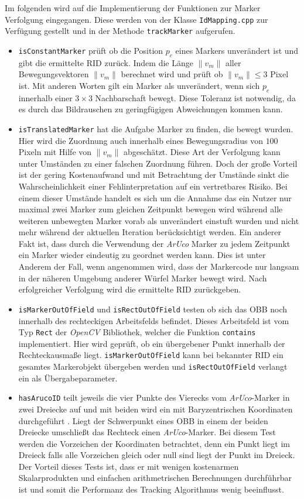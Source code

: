 Im folgenden wird auf die Implementierung der Funktionen zur Marker Verfolgung  eingegangen. Diese werden von der Klasse \texttt{IdMapping.cpp} zur Verfügung gestellt und in der Methode \texttt{trackMarker} aufgerufen.
\begin{itemize}
\item \texttt{isConstantMarker} prüft ob die Position $p_c$ eines Markers unverändert ist und gibt die ermittelte RID zurück. Indem die Länge $\|v_m\|$ aller Bewegungsvektoren $\|v_m\|$ berechnet wird und prüft ob $\|v_m\|\le 3$ Pixel ist. Mit anderen Worten gilt ein Marker als unverändert, wenn sich $p_c$ innerhalb einer $3 \times 3$ Nachbarschaft bewegt. Diese Toleranz ist notwendig, da es durch das Bildrauschen zu geringfügigen Abweichungen kommen kann.
\item \texttt{isTranslatedMarker} hat die Aufgabe Marker zu finden, die bewegt wurden. Hier wird die Zuordnung auch innerhalb eines Bewegungsradius von $100$ Pixeln mit Hilfe von $\|v_m\|$  abgeschätzt. Diese Art der Verfolgung kann unter Umständen zu einer falschen Zuordnung führen. Doch der große Vorteil ist der gering Kostenaufwand und mit Betrachtung der Umstände sinkt die Wahrscheinlichkeit einer Fehlinterpretation auf ein vertretbares Risiko. Bei einem dieser Umstände handelt es sich um die Annahme das ein Nutzer nur maximal zwei Marker zum gleichen Zeitpunkt bewegen wird während alle weiteren unbewegten Marker vorab als unverändert einstuft wurden und nicht mehr während der aktuellen Iteration berücksichtigt werden.
Ein anderer Fakt ist, dass durch die Verwendung der \textit{ArUco} Marker zu jedem Zeitpunkt ein Marker wieder eindeutig zu geordnet werden kann. Dies ist unter Anderem der Fall, wenn angenommen wird, dass der Markercode nur langsam in der näheren Umgebung anderer Würfel Marker bewegt wird. Nach erfolgreicher Verfolgung wird die ermittelte RID zurückgeben.
\item \texttt{isMarkerOutOfField} und \texttt{isRectOutOfField} testen ob sich das OBB noch innerhalb des rechteckigen Arbeitsfelds befindet. Dieses Arbeitsfeld ist vom Typ \texttt{Rect} der \textit{OpenCV} Bibliothek, welcher die Funktion \texttt{contains} implementiert. Hier wird geprüft, ob ein übergebener Punkt innerhalb der Rechteckausmaße liegt. \texttt{isMarkerOutOfField} kann bei bekannter RID ein gesamtes Markerobjekt übergeben werden und \texttt{isRectOutOfField} verlangt ein  als Übergabeparameter.
\item \texttt{hasArucoID} teilt jeweils die vier Punkte des Vierecks vom \textit{ArUco}-Marker in zwei Dreiecke auf und mit beiden wird ein  mit Baryzentrischen Koordinaten durchgeführt \cite{article:BaryzentriFarin}. Liegt der Schwerpunkt eines OBB in einem der beiden Dreiecke umschließt das Rechteck einen \textit{ArUco}-Marker. Bei diesem Test werden die Vorzeichen der Koordinaten betrachtet, denn ein Punkt liegt im Dreieck falls alle Vorzeichen gleich oder null sind liegt der Punkt im Dreieck. Der Vorteil dieses Tests ist, dass er mit wenigen kostenarmen Skalarprodukten und einfachen arithmetrischen Berechnungen durchführbar ist und somit die Performanz des Tracking Algorithmus wenig beeinflusst. 
\end{itemize}

